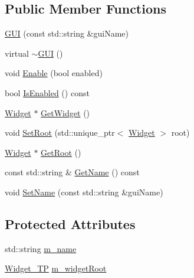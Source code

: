 \subsection*{Public Member Functions}
\begin{DoxyCompactItemize}
\item 
\mbox{\hyperlink{classec__gui_1_1_g_u_i_a6949ce17b9f0f9bdd1f00e99f2f763ee}{G\+UI}} (const std\+::string \&gui\+Name)
\item 
virtual \mbox{\hyperlink{classec__gui_1_1_g_u_i_af69316823e49f919c33dc14bd5897af3}{$\sim$\+G\+UI}} ()
\item 
void \mbox{\hyperlink{classec__gui_1_1_g_u_i_a01a71e281135c7c7e1c8ac331a6124e6}{Enable}} (bool enabled)
\item 
bool \mbox{\hyperlink{classec__gui_1_1_g_u_i_aca0145a7ab185feee31b192513cc300d}{Is\+Enabled}} () const
\item 
\mbox{\hyperlink{classec__gui_1_1_widget}{Widget}} $\ast$ \mbox{\hyperlink{classec__gui_1_1_g_u_i_a09811efbfd85d0a9c491b0436e441fb0}{Get\+Widget}} ()
\item 
void \mbox{\hyperlink{classec__gui_1_1_g_u_i_a63708b39a452c02bfcb384a18018b58f}{Set\+Root}} (std\+::unique\+\_\+ptr$<$ \mbox{\hyperlink{classec__gui_1_1_widget}{Widget}} $>$ root)
\item 
\mbox{\hyperlink{classec__gui_1_1_widget}{Widget}} $\ast$ \mbox{\hyperlink{classec__gui_1_1_g_u_i_a2928769621adeaf68920c3e76e9c81a1}{Get\+Root}} ()
\item 
const std\+::string \& \mbox{\hyperlink{classec__gui_1_1_g_u_i_a9714da27dee267066818446c6b42f7cd}{Get\+Name}} () const
\item 
void \mbox{\hyperlink{classec__gui_1_1_g_u_i_ad9ff9a25e659151f4e7456a5ab01c06f}{Set\+Name}} (const std\+::string \&gui\+Name)
\end{DoxyCompactItemize}
\subsection*{Protected Attributes}
\begin{DoxyCompactItemize}
\item 
std\+::string \mbox{\hyperlink{classec__gui_1_1_g_u_i_a693e16eaaa1b1fcba80170ae8f1556e2}{m\+\_\+name}}
\item 
\mbox{\hyperlink{classec__gui_1_1_g_u_i_a2b94294ea5a4ad9f8edcb4eb4d97151a}{Widget\+\_\+\+TP}} \mbox{\hyperlink{classec__gui_1_1_g_u_i_ad6b9982eb7b129a78c593da5008c2ac0}{m\+\_\+widget\+Root}}
\end{DoxyCompactItemize}


